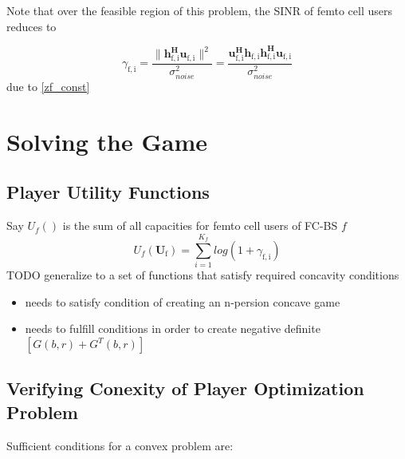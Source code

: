 \documentclass[12pt]{article}
\begin{document}
	
Note that over the feasible region of this problem, the SINR of femto cell users reduces to 

	\begin{equation}\label{zf_snr}
	\gamma_{\mathrm{f,i}} = \frac{\|\mathbf{h^H_{\mathrm{f,i}}u_{\mathrm{f,i}}}\|^2}
	{\sigma^2_{noise}  
	}
	= 
	\frac{\mathbf{u^H_{\mathrm{f,i}}h_{\mathrm{f,i}}h^H_{\mathrm{f,i}}u_{\mathrm{f,i}}}}
	{\sigma^2_{noise}  
	}
	\end{equation}
due to  \eqref{zf_const}
\section{Solving the Game}
\subsection{Player Utility Functions}

Say $U_f() $ is the sum of all capacities for femto cell users of FC-BS $f$ 
\begin{equation*}
U_f(\mathbf{U}_\mathrm{f}) = \sum^{K_f}_{i=1} log(1+\gamma_{\mathrm{f,i}})
\end{equation*}
TODO generalize to a set of functions that satisfy required concavity conditions
\begin{itemize}
\item needs to satisfy condition of creating an n-persion concave game
\item needs to fulfill conditions in order to create negative definite $[G(b,r)+G^{T}(b,r)] $
\end{itemize}

\subsection{Verifying Conexity of Player Optimization Problem}

Sufficient conditions for a convex problem are:
\end{document}
